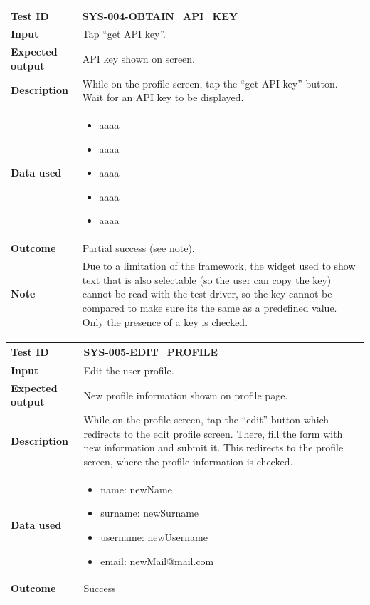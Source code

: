 \begin{table}[H]
    \centering
    \begin{tabular}{p{3cm}p{10cm}}
    \textbf{Test ID} & SYS-004-OBTAIN\_API\_KEY \\ \hline
    \textbf{Input} & Tap “get API key”. \\ \hline
    \textbf{Expected output} & API key shown on screen. \\ \hline
    \textbf{Description} & While on the profile screen, tap the “get API key” button. Wait for an API key to be displayed. \\ \hline
    \textbf{Data used} & 
        \begin{itemize}[label={}] \itemsep0em
            \item aaaa
            \item aaaa
            \item aaaa
            \item aaaa
            \item aaaa
        \end{itemize} \\ \hline
    \textbf{Outcome} & Partial success (see note). \\ \hline
    \textbf{Note} & Due to a limitation of the framework, the widget used to show text that is also selectable (so the user can copy the key) cannot be read with the test driver, so the key cannot be compared to make sure its the same as a predefined value. Only the presence of a key is checked. \\ \hline
    \end{tabular}
\end{table}

\begin{table}[H]
    \centering
    \begin{tabular}{p{3cm}p{10cm}}
    \textbf{Test ID} & SYS-005-EDIT\_PROFILE \\ \hline
    \textbf{Input} & Edit the user profile. \\ \hline
    \textbf{Expected output} & New profile information shown on profile page. \\ \hline
    \textbf{Description} & While on the profile screen, tap the “edit” button which redirects to the edit profile screen. There, fill the form with new information and submit it. This redirects to the profile screen, where the profile information is checked. \\ \hline
    \textbf{Data used} & 
        \begin{itemize}[label={}] \itemsep0em
            \item name: newName
            \item surname: newSurname
            \item username: newUsername
            \item email: newMail@mail.com
        \end{itemize} \\ \hline
    \textbf{Outcome} & Success \\ \hline
    \end{tabular}
\end{table}

